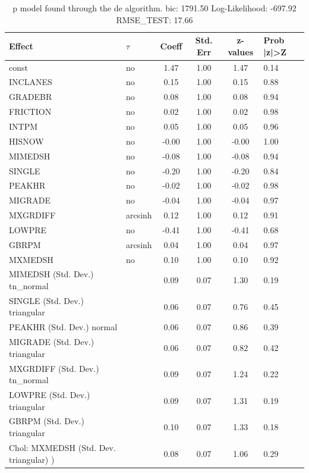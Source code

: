 \begin{table}
	\caption{p model found through the de algorithm. bic: 1791.50 Log-Likelihood: -697.92 RMSE_TEST: 17.66}
	\begin{center}
		\begin{tabular}{|l|l|c|c|c|l|}
			\hline
			Effect & $\tau$ & Coeff & Std. Err & z-values & Prob |z|>Z \\
			\hline
			const & no & 1.47 & 1.00 & 1.47 & 0.14 \\
			\hline
			INCLANES & no & 0.15 & 1.00 & 0.15 & 0.88 \\
			\hline
			GRADEBR & no & 0.08 & 1.00 & 0.08 & 0.94 \\
			\hline
			FRICTION & no & 0.02 & 1.00 & 0.02 & 0.98 \\
			\hline
			INTPM & no & 0.05 & 1.00 & 0.05 & 0.96 \\
			\hline
			HISNOW & no & -0.00 & 1.00 & -0.00 & 1.00 \\
			\hline
			MIMEDSH & no & -0.08 & 1.00 & -0.08 & 0.94 \\
			\hline
			SINGLE & no & -0.20 & 1.00 & -0.20 & 0.84 \\
			\hline
			PEAKHR & no & -0.02 & 1.00 & -0.02 & 0.98 \\
			\hline
			MIGRADE & no & -0.04 & 1.00 & -0.04 & 0.97 \\
			\hline
			MXGRDIFF & arcsinh & 0.12 & 1.00 & 0.12 & 0.91 \\
			\hline
			LOWPRE & no & -0.41 & 1.00 & -0.41 & 0.68 \\
			\hline
			GBRPM & arcsinh & 0.04 & 1.00 & 0.04 & 0.97 \\
			\hline
			MXMEDSH & no & 0.10 & 1.00 & 0.10 & 0.92 \\
			\hline
			MIMEDSH (Std. Dev.) tn_normal &  & 0.09 & 0.07 & 1.30 & 0.19 \\
			\hline
			SINGLE (Std. Dev.) triangular &  & 0.06 & 0.07 & 0.76 & 0.45 \\
			\hline
			PEAKHR (Std. Dev.) normal &  & 0.06 & 0.07 & 0.86 & 0.39 \\
			\hline
			MIGRADE (Std. Dev.) triangular &  & 0.06 & 0.07 & 0.82 & 0.42 \\
			\hline
			MXGRDIFF (Std. Dev.) tn_normal &  & 0.09 & 0.07 & 1.24 & 0.22 \\
			\hline
			LOWPRE (Std. Dev.) triangular &  & 0.09 & 0.07 & 1.31 & 0.19 \\
			\hline
			GBRPM (Std. Dev.) triangular &  & 0.10 & 0.07 & 1.33 & 0.18 \\
			\hline
			 Chol: MXMEDSH (Std. Dev. triangular) ) &  & 0.08 & 0.07 & 1.06 & 0.29 \\
			\hline
		\end{tabular}
	\end{center}
\end{table}